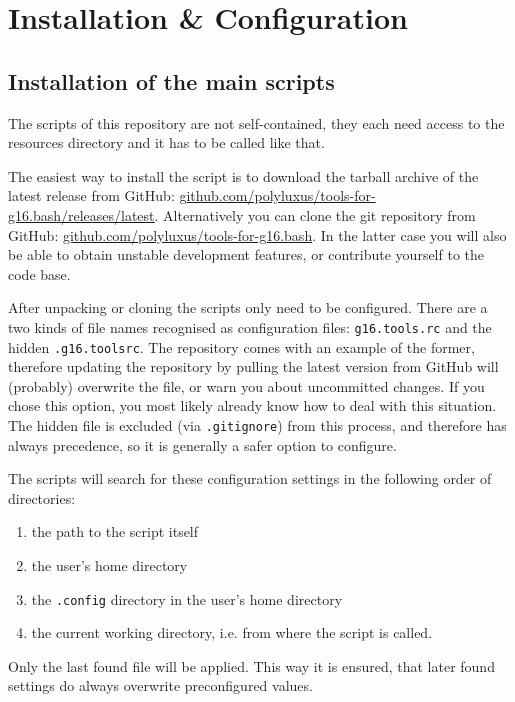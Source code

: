 \documentclass[   %
  final,          %
  a4paper         %
]{article}
\begin{document}
\section{Installation \& Configuration}
\label{sec:installation}

\subsection{Installation of the main scripts}

The scripts of this repository are not self-contained,
they each need access to the resources directory 
and it has to be called like that.

The easiest way to install the script is to download the tarball archive of the latest release from GitHub:
\href{https://github.com/polyluxus/tools-for-g16.bash/releases/latest}{github.com/polyluxus/tools-for-g16.bash/releases/latest}.
Alternatively you can clone the git repository from GitHub:
\href{https://github.com/polyluxus/tools-for-g16.bash}{github.com/polyluxus/tools-for-g16.bash}.
In the latter case you will also be able to obtain unstable development features,
or contribute yourself to the code base.

After unpacking or cloning the scripts only need to be configured.
There are a two kinds of file names recognised as configuration files:
\lstinline`g16.tools.rc` and the hidden \lstinline`.g16.toolsrc`.
The repository comes with an example of the former, 
therefore updating the repository by pulling the latest version from GitHub will (probably) overwrite the file,
or warn you about uncommitted changes.
If you chose this option, you most likely already know how to deal with this situation.
The hidden file is excluded (via \texttt{.gitignore}) from this process,
and therefore has always precedence, so it is generally a safer option to configure.

The scripts will search for these configuration settings in the following order of directories:
\begin{enumerate}
  \item the path to the script itself 
  \item the user's home directory
  \item the \texttt{.config} directory in the user's home directory
  \item the current working directory, i.e. from where the script is called.
\end{enumerate}
Only the last found file will be applied.
This way it is ensured, that later found settings do always overwrite preconfigured values.
\end{document}
